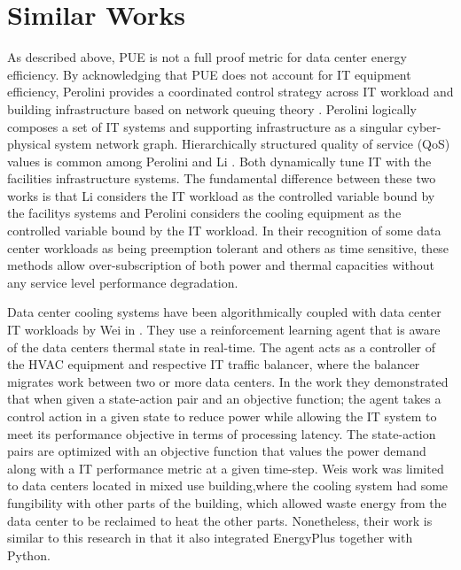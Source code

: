 \section*{Similar Works}

As described above, PUE is not a full proof metric for data center energy efficiency. By acknowledging that PUE does not account for IT equipment efficiency, Perolini provides a coordinated control strategy across IT workload and building infrastructure based on network queuing theory \citep{parolini12}. Perolini logically composes a set of IT systems and supporting infrastructure as a singular cyber-physical system network graph. Hierarchically structured quality of service (QoS) values is common among Perolini and Li \citep{Li18}. Both dynamically tune IT with the facilities infrastructure systems. The fundamental difference between these two works is that Li considers the IT workload as the controlled variable bound by the facility\textsc{}s systems and Perolini considers the cooling equipment as the controlled variable bound by the IT workload. In their recognition of some data center workloads as being preemption tolerant and others as time sensitive, these methods allow over-subscription of both power and thermal capacities without any service level performance degradation. 

Data center cooling systems have been algorithmically coupled with data center IT workloads by Wei in \citep{wei17}. They use a reinforcement learning agent that is aware of the data center\textsc{}s thermal state in real-time. The agent acts as a controller of the HVAC equipment and respective IT traffic balancer, where the balancer migrates work between two or more data centers. In the work they demonstrated that when given a state-action pair and an objective function; the agent takes a control action in a given state to reduce power while allowing the IT system to meet it\textsc{}s performance objective in terms of processing latency. The state-action pairs are optimized with an objective function that values the power demand along with a IT performance metric at a given time-step. Wei\textsc{}s work was limited to data centers located in mixed use building,where the cooling system had some fungibility with other parts of the building, which allowed waste energy from the data center to be reclaimed to heat the other parts. Nonetheless, their work is similar to this research in that it also integrated EnergyPlus together with Python.

